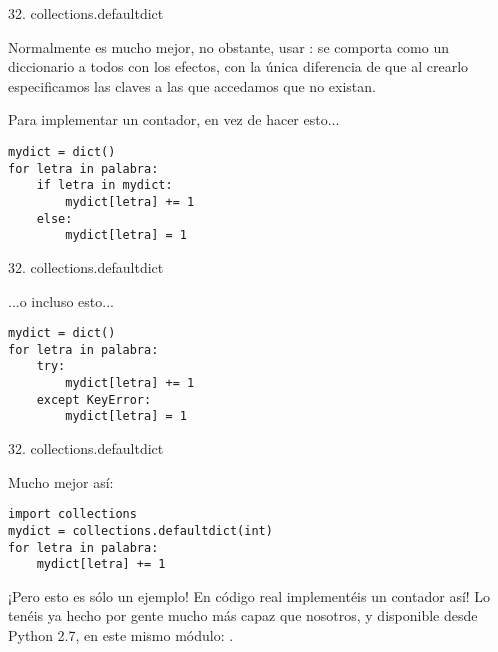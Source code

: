 
\begin{frame}[fragile]{32. collections.defaultdict}
  \small
  \begin{block}{}
    \centering
    Normalmente es mucho mejor, no obstante, usar
    : se comporta como un diccionario a todos
    con los efectos, con la única diferencia de que al crearlo
    especificamos  las
    claves a las que accedamos que no existan.
  \end{block}

  \footnotesize
  \begin{exampleblock}
    {Para implementar un contador, en vez de hacer esto...}
    \begin{lstlisting}
mydict = dict()
for letra in palabra:
    if letra in mydict:
        mydict[letra] += 1
    else:
        mydict[letra] = 1
    \end{lstlisting}
  \end{exampleblock}
\end{frame}

\begin{frame}[fragile]{32. collections.defaultdict}
  \footnotesize
  \begin{exampleblock}
    {...o incluso esto...}
    \begin{lstlisting}
mydict = dict()
for letra in palabra:
    try:
        mydict[letra] += 1
    except KeyError:
        mydict[letra] = 1
    \end{lstlisting}
  \end{exampleblock}
\end{frame}

\begin{frame}[fragile]{32. collections.defaultdict}
  \footnotesize
  \begin{exampleblock}
    {Mucho mejor así:}
    \begin{lstlisting}
import collections
mydict = collections.defaultdict(int)
for letra in palabra:
    mydict[letra] += 1
    \end{lstlisting}
  \end{exampleblock}

  \small
  \begin{alertblock}{}
    \centering
    ¡Pero esto es sólo un ejemplo! En código real 
    implementéis un contador así! Lo tenéis ya hecho por gente mucho
    más capaz que nosotros, y disponible desde Python 2.7, en este
    mismo módulo:
    .
  \end{alertblock}
\end{frame}

